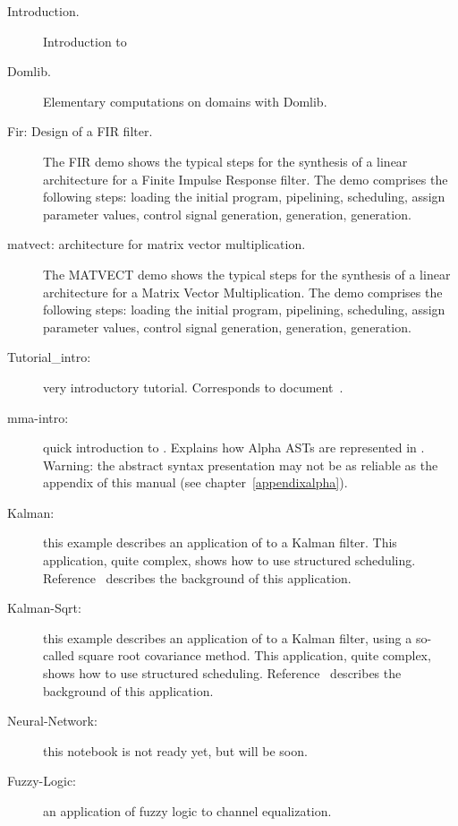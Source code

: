 \begin{description}
\item [Introduction.] Introduction to {\Alpha}

\item [Domlib.] Elementary computations on domains with Domlib.

\item [Fir: Design of a FIR filter.]  The FIR demo shows the typical
steps for the synthesis of a linear architecture for a Finite Impulse
Response filter.  The demo comprises the following steps: loading the
initial program, pipelining, scheduling, assign parameter values,
control signal generation, {\alphaz} generation, {\alphard} generation.

\item [matvect: architecture for matrix vector
multiplication.] 

The MATVECT demo shows the typical steps for the
synthesis of a linear architecture for a Matrix Vector Multiplication.
The demo comprises the following steps: loading the initial program,
pipelining, scheduling, assign parameter values, control signal
generation,  {\alphaz} generation, {\alphard} generation.

\item[Tutorial\_intro: ]
very introductory tutorial. Corresponds to document~\cite{first-tutorial}.

\item[mma-intro: ]
quick introduction to \mma{}. Explains how Alpha ASTs are represented
in \mma{}. Warning: the abstract syntax presentation may not be as reliable as
the appendix of this manual (see chapter~\ref{appendixalpha}).
\item[Kalman: ]
this example describes an application of \mmalfa{} to a Kalman
filter. This application, quite complex, shows how to use 
structured scheduling. Reference~\cite{parelec} describes the 
background of this application. 
\item[Kalman-Sqrt: ]
this example describes an application of \mmalfa{} to a Kalman
filter, using a so-called square root covariance method. 
This application, quite complex, shows how to use 
structured scheduling. Reference~\cite{cce} describes the 
background of this application. 

\item[Neural-Network: ]
this notebook is not ready yet, but will be soon.
\item[Fuzzy-Logic: ]
an application of fuzzy logic to channel equalization. 
\end{description}

